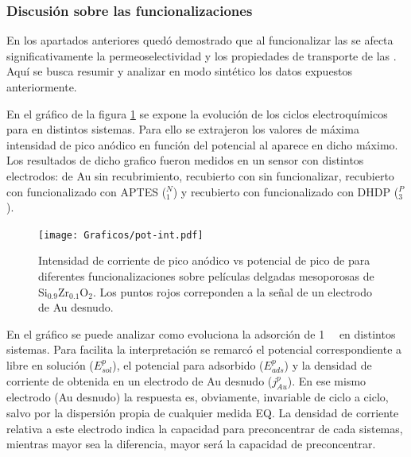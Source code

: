 	 	\subsubsection{Discusión sobre las funcionalizaciones}

	 	 En los apartados anteriores quedó demostrado que al funcionalizar las \pdmZ\space se afecta significativamente la permeoselectividad y los propiedades de transporte de las \pdm. Aquí se busca resumir y analizar en modo sintético los datos expuestos anteriormente. 

	 	 En el gráfico de la figura \ref{fig:pot-int} se expone la evolución de los ciclos electroquímicos para \ru\space en distintos sistemas. Para ello se extrajeron los valores de máxima intensidad de pico anódico en función del potencial al aparece en dicho máximo. Los resultados de dicho grafico fueron medidos en un sensor con distintos electrodos: de Au sin recubrimiento, recubierto con \pdmZ\space sin funcionalizar, recubierto con \pdmZ\space funcionalizado con APTES (\pdmZ$^N_1$) y recubierto con \pdmZ\space funcionalizado con DHDP (\pdmZ$^P_3$).

	 			 \begin{figure}[h!]	
					\centering
			 	    \texttt{[image: Graficos/pot-int.pdf]}
			        \caption[Evolución de la señal de \ru\space para distintos sistemas]{Intensidad de corriente de pico anódico vs potencial de pico de \aminorutenio\space para diferentes funcionalizaciones sobre películas delgadas mesoporosas de Si$_{0.9}$Zr$_{0.1}$O$_2$. Los puntos rojos correponden a la señal de un electrodo de Au desnudo.}
			        \label{fig:pot-int}
			        \vspace*{3mm}
			      	\end{figure}

	 	 En el gráfico se puede analizar como evoluciona la adsorción de \ru\space \SI{1}{\milli\Molar} en distintos sistemas. Para facilita la interpretación se remarcó el potencial correspondiente a \ru\space libre en solución ($E^p_{sol}$), el potencial para \ru\space adsorbido ($E^p_{ads}$) y la densidad de corriente de \ru\space obtenida en un electrodo de Au desnudo ($j^p_{Au}$). En ese mismo electrodo (Au desnudo) la respuesta es, obviamente, invariable de ciclo a ciclo, salvo por la dispersión propia de cualquier medida EQ. La densidad de corriente relativa a este electrodo indica la capacidad para preconcentrar de cada sistemas, mientras mayor sea la diferencia, mayor será la capacidad de preconcentrar.

